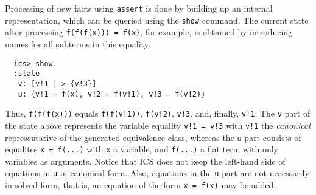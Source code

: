 \documentclass[12pt]{article}
\begin{document}
Processing of new facts using {\tt assert} is done by building up
an internal representation, which can be queried using the {\tt show}
command.  The current state after processing {\tt f(f(f(x))) = f(x)},
for example, is obtained by introducing names for all subterms in 
this equality.
  \begin{verbatim}
  ics> show. 
  :state 
   v: [v!1 |-> {v!3}]
   u: {v!1 = f(x), v!2 = f(v!1), v!3 = f(v!2)}
  \end{verbatim}
Thus, {\tt f(f(f(x)))} equals {\tt f(f(v!1))}, {\tt f(v!2)}, {\tt v!3},
and, finally, {\tt v!1}\@. The {\tt v} part of the state above represents
the variable equality {\tt v!1 = v!3} with {\tt v!1} the {\em canonical} 
representative of the generated equivalence class, whereas the {\tt u}
part consists of equalites {\tt x = f(...)} with {\tt x} a variable,
and {\tt f(...)} a flat term with only variables as arguments. Notice
that ICS does not keep the left-hand side of equations in {\tt u} in
canonical form. Also, equations in the {\tt u} part are not necessarily
in solved form, that is, an equation of the form {\tt x = f(x)} may be
added.
\end{document}
